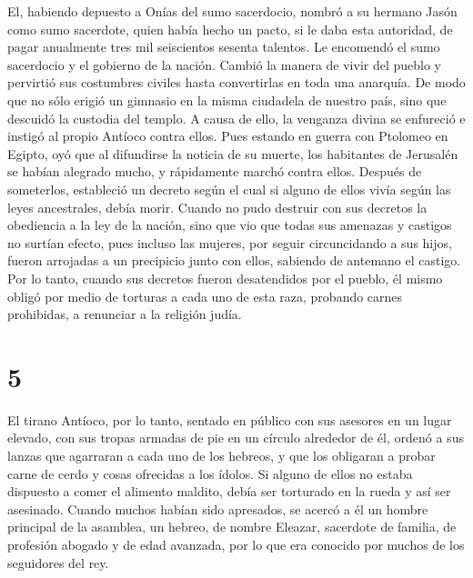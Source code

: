  El, habiendo depuesto a Onías del sumo sacerdocio,
nombró a su hermano Jasón como sumo sacerdote,  quien
había hecho un pacto, si le daba esta autoridad, de pagar anualmente
tres mil seiscientos sesenta talentos.  Le encomendó el
sumo sacerdocio y el gobierno de la nación.  Cambió la
manera de vivir del pueblo y pervirtió sus costumbres civiles hasta
convertirlas en toda una anarquía.  De modo que no sólo
erigió un gimnasio en la misma ciudadela de nuestro país, sino que
descuidó la custodia del templo.  A causa de ello, la
venganza divina se enfureció e instigó al propio Antíoco contra ellos.
 Pues estando en guerra con Ptolomeo en Egipto, oyó que
al difundirse la noticia de su muerte, los habitantes de Jerusalén se
habían alegrado mucho, y rápidamente marchó contra ellos.
 Después de someterlos, estableció un decreto según el
cual si alguno de ellos vivía según las leyes ancestrales, debía morir.
 Cuando no pudo destruir con sus decretos la obediencia a
la ley de la nación, sino que vio que todas sus amenazas y castigos no
surtían efecto,  pues incluso las mujeres, por seguir
circuncidando a sus hijos, fueron arrojadas a un precipicio junto con
ellos, sabiendo de antemano el castigo.  Por lo tanto,
cuando sus decretos fueron desatendidos por el pueblo, él mismo obligó
por medio de torturas a cada uno de esta raza, probando carnes
prohibidas, a renunciar a la religión judía.

\hypertarget{section-4}{%
\section{5}\label{section-4}}

 El tirano Antíoco, por lo tanto, sentado en público con
sus asesores en un lugar elevado, con sus tropas armadas de pie en un
círculo alrededor de él,  ordenó a sus lanzas que
agarraran a cada uno de los hebreos, y que los obligaran a probar carne
de cerdo y cosas ofrecidas a los ídolos.  Si alguno de
ellos no estaba dispuesto a comer el alimento maldito, debía ser
torturado en la rueda y así ser asesinado.  Cuando muchos
habían sido apresados, se acercó a él un hombre principal de la
asamblea, un hebreo, de nombre Eleazar, sacerdote de familia, de
profesión abogado y de edad avanzada, por lo que era conocido por muchos
de los seguidores del rey.

